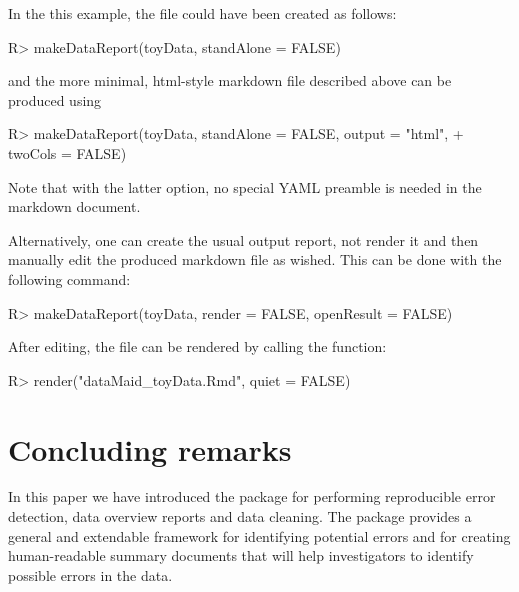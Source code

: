 \documentclass[article,shortnames]{jss}
\begin{document}
In the this example, the  file could have
been created as follows:

\begin{Schunk}
\begin{Sinput}
R> makeDataReport(toyData, standAlone = FALSE)
\end{Sinput}
\end{Schunk}

and the more minimal, html-style  markdown file described above can be produced using

\begin{Schunk}
\begin{Sinput}
R> makeDataReport(toyData, standAlone = FALSE, output = "html", 
+    twoCols = FALSE)
\end{Sinput}
\end{Schunk}

Note that with the latter option, no special YAML preamble is needed in the  markdown document. 

Alternatively, one can create the usual output report, not render it and then manually edit the produced  markdown file as wished. This can be done with the following command:

\begin{Schunk}
\begin{Sinput}
R> makeDataReport(toyData, render = FALSE, openResult = FALSE)
\end{Sinput}
\end{Schunk}

After editing, the file can be rendered by calling the  function:

\begin{Schunk}
\begin{Sinput}
R> render("dataMaid_toyData.Rmd", quiet = FALSE)
\end{Sinput}
\end{Schunk}


\section{Concluding remarks}
\label{conclusion}

In this paper we have introduced the  package 
for performing reproducible error detection, data overview reports and data cleaning. The package provides a general and extendable framework for
identifying potential errors and for creating human-readable summary
documents that will help investigators to identify possible errors in
the data.
\end{document}
